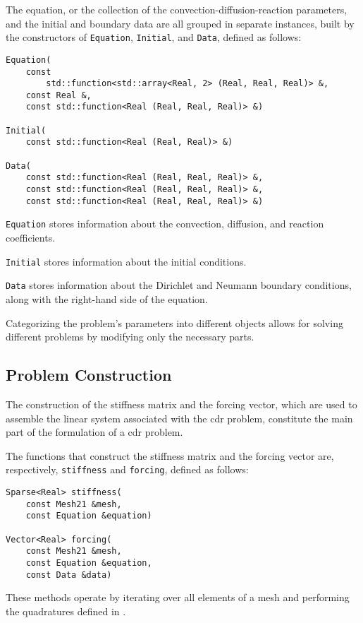 The equation, or the collection of the convection-diffusion-reaction parameters, and the initial and boundary data are all grouped in separate instances, built by the constructors of \lstinline{Equation}, \lstinline{Initial}, and \lstinline{Data}, defined as follows:
\begin{lstlisting}[style=cpp]
Equation(
    const 
        std::function<std::array<Real, 2> (Real, Real, Real)> &, 
    const Real &, 
    const std::function<Real (Real, Real, Real)> &)

Initial(
    const std::function<Real (Real, Real)> &)

Data(
    const std::function<Real (Real, Real, Real)> &, 
    const std::function<Real (Real, Real, Real)> &, 
    const std::function<Real (Real, Real, Real)> &)
\end{lstlisting}

\lstinline{Equation} stores information about the convection, diffusion, and reaction coefficients.

\lstinline{Initial} stores information about the initial conditions.

\lstinline{Data} stores information about the Dirichlet and Neumann boundary conditions, along with the right-hand side of the equation.

Categorizing the problem's parameters into different objects allows for solving different problems by modifying only the necessary parts.

\newpage
\subsection{Problem Construction}

The construction of the stiffness matrix and the forcing vector, which are used to assemble the linear system associated with the \acrshort{cdr} problem, constitute the main part of the formulation of a \acrshort{cdr} problem.

The functions that construct the stiffness matrix and the forcing vector are, respectively, \lstinline{stiffness} and \lstinline{forcing}, defined as follows:
\begin{lstlisting}[style=cpp]
Sparse<Real> stiffness(
    const Mesh21 &mesh, 
    const Equation &equation)

Vector<Real> forcing(
    const Mesh21 &mesh, 
    const Equation &equation, 
    const Data &data)
\end{lstlisting}
These methods operate by iterating over all elements of a mesh and performing the quadratures defined in .

